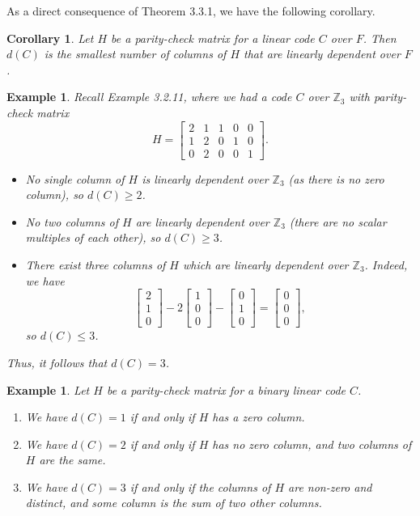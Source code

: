 \documentclass[10pt]{article}
\newcommand{\Z}{\mathbb{Z}}
\theoremstyle{newstyle}
\newtheorem{cor}[thm]{Corollary}
\newtheorem{exmp}[thm]{Example}
\begin{document}
As a direct consequence of Theorem 3.3.1, we have the following corollary. 

\begin{cor}
Let $H$ be a parity-check matrix for a linear code $C$ over $F$. Then $d(C)$ is the smallest 
number of columns of $H$ that are linearly dependent over $F$. 
\end{cor}

\begin{exmp}
Recall Example 3.2.11, where we had a code $C$ over $\Z_3$ with parity-check matrix 
\[ H = \begin{bmatrix} 2 & 1 & 1 & 0 & 0 \\ 1 & 2 & 0 & 1 & 0 \\ 0 & 2 & 0 & 0 & 1 \end{bmatrix}. \]
\begin{itemize}
    \item No single column of $H$ is linearly dependent over $\Z_3$ (as there is no zero column), 
    so $d(C) \geq 2$. 
    \item No two columns of $H$ are linearly dependent over $\Z_3$ (there are no scalar multiples of 
    each other), so $d(C) \geq 3$. 
    \item There exist three columns of $H$ which are linearly dependent over $\Z_3$. Indeed, we have 
    \[ \begin{bmatrix} 2\\1\\0\end{bmatrix} - 2\begin{bmatrix}1\\0\\0\end{bmatrix} 
    - \begin{bmatrix}0\\1\\0\end{bmatrix} = \begin{bmatrix}0\\0\\0\end{bmatrix}, \]
    so $d(C) \leq 3$. 
\end{itemize}
Thus, it follows that $d(C) = 3$. 
\end{exmp}

\begin{exmp}
Let $H$ be a parity-check matrix for a binary linear code $C$. 
\begin{enumerate}[(1)]
    \item We have $d(C) = 1$ if and only if $H$ has a zero column. 
    \item We have $d(C) = 2$ if and only if $H$ has no zero column, and two columns of $H$ are the same.
    \item We have $d(C) = 3$ if and only if the columns of $H$ are non-zero and distinct, 
    and some column is the sum of two other columns. 
\end{enumerate}
\end{exmp}
\end{document}
